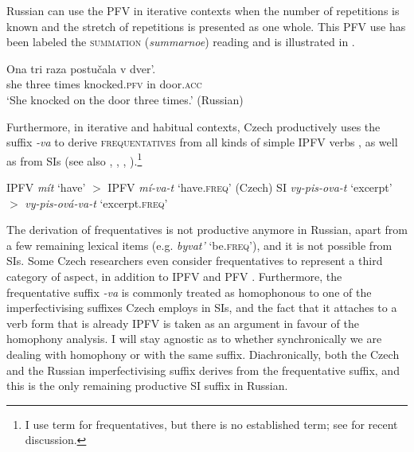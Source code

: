 \documentclass[output=paper,colorlinks,citecolor=brown]{langscibook}
\begin{document}
Russian can use the PFV in iterative contexts when the number of repetitions is known and the stretch of repetitions is presented as one whole. This PFV use has been labeled the \textsc{summation} (\textit{summarnoe}) reading and is illustrated in  \citep[from][19; my glosses and translation]{zaliznjaksmelev97}.

\ea \label{ex:sum}
\gll Ona tri raza postučala v dver'.\\
    she three times knocked.\textsc{pfv} in door.\textsc{acc}\\
\glt    `She knocked on the door three times.' \hfill (Russian)
\z

\noindent Furthermore, in iterative and habitual contexts, Czech productively uses the suffix \textit{-va} to derive \textsc{frequentatives} from all kinds of simple IPFV verbs , as well as from SIs  \citep[example adapted from][]{biskup23adv} (see also \citealt{kopecny62}, \citealt{petr86}, \citealt{Filip.Carlson1997}, ).\footnote{I use  term for frequentatives, but there is no established term; see  for recent discussion.} 

\ea\label{ex:freq}
\ea IPFV \textit{mít} `have' $>$ IPFV \textit{mí-va-t} `have.\textsc{freq}' \hfill (Czech)\label{ex:freqa}
\ex SI \textit{vy-pis-ova-t} `excerpt' $>$ \textit{vy-pis-ová-va-t} `excerpt.\textsc{freq}'\label{ex:freqb}
\z 
\z

\noindent The derivation of frequentatives is not productive anymore in Russian, apart from a few remaining lexical items (e.g. \textit{byvat'} `be.\textsc{freq}'), and it is not possible from SIs. Some Czech researchers even consider frequentatives to represent a third category of aspect, in addition to IPFV and PFV \citep[see discussion in][]{kopecny62}. Furthermore, the frequentative suffix \textit{-va} is commonly treated as homophonous to one of the imperfectivising suffixes Czech employs in SIs, and the fact that it attaches to a verb form that is already IPFV is taken as an argument in favour of the homophony analysis. I will stay agnostic as to whether synchronically we are dealing with homophony or with the same suffix. Diachronically, both the Czech and the Russian imperfectivising suffix derives from the frequentative suffix, and this is the only remaining productive SI suffix in Russian.  
\end{document}

